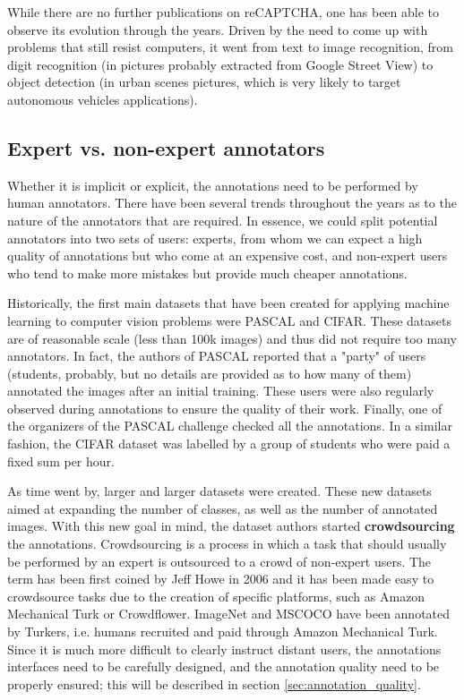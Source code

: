 While there are no further publications on reCAPTCHA, one has been able to observe its evolution through the years. Driven by the need to come up with problems that still resist computers, it went from text to image recognition, from digit recognition (in pictures probably extracted from Google Street View) to object detection (in urban scenes pictures, which is very likely to target autonomous vehicles applications).


\subsection{Expert vs. non-expert annotators}

Whether it is implicit or explicit, the annotations need to be performed by human annotators. There have been several trends throughout the years as to the nature of the annotators that are required. In essence, we could split potential annotators into two sets of users: experts, from whom we can expect a high quality of annotations but who come at an expensive cost, and non-expert users who tend to make more mistakes but provide much cheaper annotations. 

Historically, the first main datasets that have been created for applying machine learning to computer vision problems were PASCAL and CIFAR. These datasets are of reasonable scale (less than 100k images) and thus did not require too many annotators. In fact, the authors of PASCAL \cite{Everingham10} reported that a "party" of users (students, probably, but no details are provided as to how many of them) annotated the images after an initial training. These users were also regularly observed during annotations to ensure the quality of their work. Finally, one of the organizers of the PASCAL challenge checked all the annotations. In a similar fashion, the CIFAR dataset \cite{krizhevsky2009learning} was labelled by a group of students who were paid a fixed sum per hour.

As time went by, larger and larger datasets were created. These new datasets aimed at expanding the number of classes, as well as the number of annotated images. With this new goal in mind, the dataset authors started \textbf{crowdsourcing} the annotations. Crowdsourcing is a process in which a task that should usually be performed by an expert is outsourced to a crowd of non-expert users. The term has been first coined by Jeff Howe in 2006 \cite{howe2006rise} and it has been made easy to crowdsource tasks due to the creation of specific platforms, such as Amazon Mechanical Turk or Crowdflower. ImageNet and MSCOCO have been annotated by Turkers, i.e. humans recruited and paid through Amazon Mechanical Turk. Since it is much more difficult to clearly instruct distant users, the annotations interfaces need to be carefully designed, and the annotation quality need to be properly ensured; this will be described in section \ref{sec:annotation_quality}.  	 

